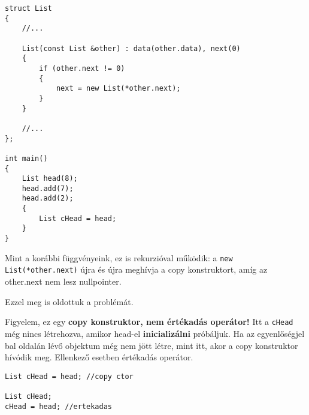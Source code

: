 \documentclass[a4paper,11.5pt,table]{article}
\begin{document}
	
\begin{lstlisting}
struct List
{
	//...
	
	List(const List &other) : data(other.data), next(0)
	{
		if (other.next != 0)
		{
			next = new List(*other.next);
		}
	}
	
	//...
};

int main()
{
	List head(8);
	head.add(7);
	head.add(2);
	{
		List cHead = head;
	}
}
\end{lstlisting}
	Mint a korábbi függvényeink, ez is rekurzióval működik: a \texttt{new List(*other.next)} újra és újra meghívja a copy konstruktort, amíg az other.next nem lesz nullpointer.
	\begin{center}
	\end{center}
	
	\medskip
	Ezzel meg is oldottuk a problémát. 
	
	Figyelem, ez egy \textbf{copy konstruktor, nem értékadás operátor!} Itt a \texttt{cHead} még nincs létrehozva, amikor head-el \textbf{inicializálni} próbáljuk. Ha az egyenlőségjel bal oldalán lévő objektum még nem jött létre, mint itt, akor a copy konstruktor hívódik meg. Ellenkező esetben értékadás operátor.
	\begin{lstlisting}
List cHead = head; //copy ctor

List cHead;
cHead = head; //ertekadas
	\end{lstlisting}
	
\end{document}
